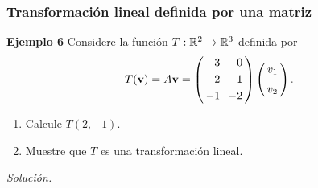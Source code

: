 \begin{frame}\frametitle{Transformación lineal definida por una matriz}

\begin{ej}{\textbf{Ejemplo 6}}
	\justifying
	Considere la función $T:\mathbb{R}^2\to \mathbb{R}^3$ definida por
	\[
	T(\mathbf{v}) = A\mathbf{v} = 
	\left(
	\begin{array}{@{\hspace{0.3\tabcolsep}}r@{\hspace{1.2\tabcolsep}}r@{\hspace{0.3\tabcolsep}}}
		 3 & 0 \\[1mm]
		 2 & 1 \\[1mm]
		-1 & -2 
	\end{array}
	\right)
	\left(
	\begin{array}{@{\hspace{0.3\tabcolsep}}c@{\hspace{0.3\tabcolsep}}}
	v_1 \\[2mm]
	v_2
	\end{array}
	\right).
	\]
	
	\begin{enumerate}
		\item[\labelname{$a$}] Calcule $T(2,-1)$.
		\item[\labelname{$b$}] Muestre que $T$ es una transformación lineal.
	\end{enumerate}	
\end{ej}
\textit{Solución.}

\end{frame}


\subsection{}

